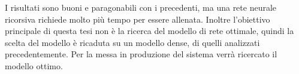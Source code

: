 I risultati sono buoni e paragonabili con i precedenti, ma una rete neurale ricorsiva richiede molto più tempo per essere allenata. Inoltre l'obiettivo principale di questa tesi non è la ricerca del modello di rete ottimale, quindi la scelta del modello è ricaduta su un modello dense, di quelli analizzati precedentemente. Per la messa in produzione del sistema verrà ricercato il modello ottimo.
